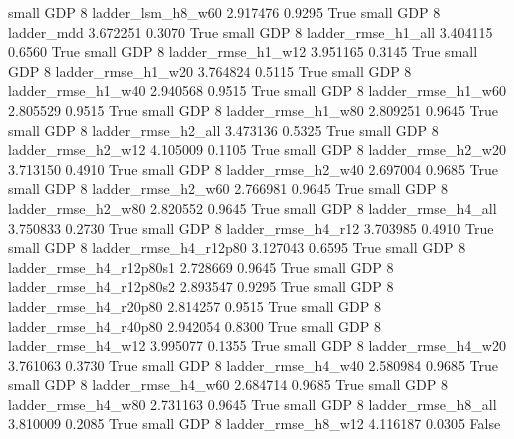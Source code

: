      small      GDP                 8        ladder_lsm_h8_w60   2.917476      0.9295    True
     small      GDP                 8               ladder_mdd   3.672251      0.3070    True
     small      GDP                 8       ladder_rmse_h1_all   3.404115      0.6560    True
     small      GDP                 8       ladder_rmse_h1_w12   3.951165      0.3145    True
     small      GDP                 8       ladder_rmse_h1_w20   3.764824      0.5115    True
     small      GDP                 8       ladder_rmse_h1_w40   2.940568      0.9515    True
     small      GDP                 8       ladder_rmse_h1_w60   2.805529      0.9515    True
     small      GDP                 8       ladder_rmse_h1_w80   2.809251      0.9645    True
     small      GDP                 8       ladder_rmse_h2_all   3.473136      0.5325    True
     small      GDP                 8       ladder_rmse_h2_w12   4.105009      0.1105    True
     small      GDP                 8       ladder_rmse_h2_w20   3.713150      0.4910    True
     small      GDP                 8       ladder_rmse_h2_w40   2.697004      0.9685    True
     small      GDP                 8       ladder_rmse_h2_w60   2.766981      0.9645    True
     small      GDP                 8       ladder_rmse_h2_w80   2.820552      0.9645    True
     small      GDP                 8       ladder_rmse_h4_all   3.750833      0.2730    True
     small      GDP                 8       ladder_rmse_h4_r12   3.703985      0.4910    True
     small      GDP                 8    ladder_rmse_h4_r12p80   3.127043      0.6595    True
     small      GDP                 8  ladder_rmse_h4_r12p80s1   2.728669      0.9645    True
     small      GDP                 8  ladder_rmse_h4_r12p80s2   2.893547      0.9295    True
     small      GDP                 8    ladder_rmse_h4_r20p80   2.814257      0.9515    True
     small      GDP                 8    ladder_rmse_h4_r40p80   2.942054      0.8300    True
     small      GDP                 8       ladder_rmse_h4_w12   3.995077      0.1355    True
     small      GDP                 8       ladder_rmse_h4_w20   3.761063      0.3730    True
     small      GDP                 8       ladder_rmse_h4_w40   2.580984      0.9685    True
     small      GDP                 8       ladder_rmse_h4_w60   2.684714      0.9685    True
     small      GDP                 8       ladder_rmse_h4_w80   2.731163      0.9645    True
     small      GDP                 8       ladder_rmse_h8_all   3.810009      0.2085    True
     small      GDP                 8       ladder_rmse_h8_w12   4.116187      0.0305   False
